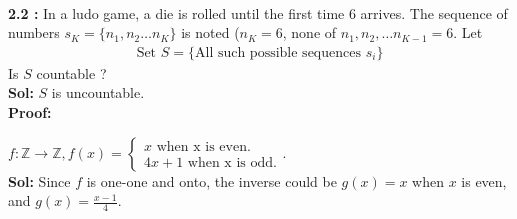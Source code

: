 \begin{frame}{}
\\ \textbf{2.2 :} In a ludo game, a die is rolled until the first time $6$ arrives. The sequence of numbers $s_K = \{n_1,n_2 \ldots n_K\}$ is noted ($n_K = 6$, none of $n_1, n_2, \ldots n_{K-1} = 6$. Let 
\begin{align*}
    \text{Set }S = \{ \text{All such possible sequences } s_i \}
\end{align*}
Is $S$ countable ?
\\ \textbf{Sol:} $S$ is uncountable.
\\ \textbf{Proof:}
    
\end{frame}

        \item $f:\mathbb{Z} \rightarrow \mathbb{Z}, f(x) = \begin{cases} x \text{ when x is even.}\\ 4x + 1 \text{ when x is odd.}\end{cases}$.
        \\ \textbf{Sol:} Since $f$ is one-one and onto, the inverse could be $g(x) = x$ when $x$ is even, and $g(x) = \frac{x - 1}{4}$.